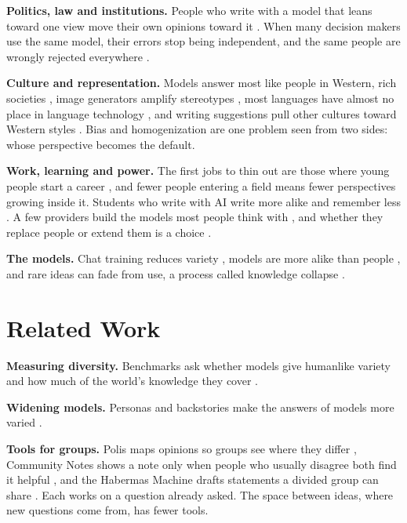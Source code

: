 \documentclass[11pt]{article}
\begin{document}
\textbf{Politics, law and institutions.} People who write with a model that leans toward one view move their own opinions toward it \citep{jakesch2023}. When many decision makers use the same model, their errors stop being independent, and the same people are wrongly rejected everywhere \citep{kleinberg2021,bommasani2022}.

\textbf{Culture and representation.} Models answer most like people in Western, rich societies \citep{atari2023,durmus2024}, image generators amplify stereotypes \citep{bianchi2023}, most languages have almost no place in language technology \citep{joshi2020}, and writing suggestions pull other cultures toward Western styles \citep{agarwal2025}. Bias and homogenization are one problem seen from two sides: whose perspective becomes the default.

\textbf{Work, learning and power.} The first jobs to thin out are those where young people start a career \citep{eloundou2024,brynjolfsson2025}, and fewer people entering a field means fewer perspectives growing inside it. Students who write with AI write more alike and remember less \citep{kosmyna2025}. A few providers build the models most people think with \citep{korinek2025}, and whether they replace people or extend them is a choice \citep{acemoglu2023}.

\textbf{The models.} Chat training reduces variety \citep{kirk2024}, models are more alike than people \citep{wenger2026,jiang2025}, and rare ideas can fade from use, a process called knowledge collapse \citep{peterson2024,wright2025}.

\section{Related Work}

\textbf{Measuring diversity.} Benchmarks ask whether models give humanlike variety \citep{zhang2025} and how much of the world's knowledge they cover \citep{wright2025}.

\textbf{Widening models.} Personas and backstories make the answers of models more varied \citep{moon2024,deng2026}.

\textbf{Tools for groups.} Polis maps opinions so groups see where they differ \citep{polis2021}, Community Notes shows a note only when people who usually disagree both find it helpful \citep{wojcik2022}, and the Habermas Machine drafts statements a divided group can share \citep{tessler2024}. Each works on a question already asked. The space between ideas, where new questions come from, has fewer tools.
\end{document}
